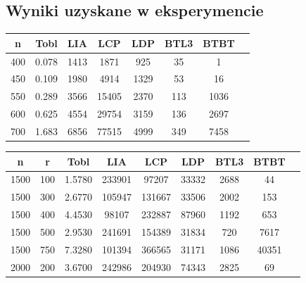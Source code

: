 \documentclass[10pt,a4paper]{article}
\begin{document}
\subsection{Wyniki uzyskane w eksperymencie}
\begin{center}
	\begin{tabular}{ |c|c|c|c|c|c|c|c| }
		\hline
		n   & Tobl  & LIA  & LCP   & LDP  & BTL3 & BTBT \\
		\hline
		400 & 0.078 & 1413 & 1871  & 925  & 35   & 1    \\
		\hline
		450 & 0.109 & 1980 & 4914  & 1329 & 53   & 16   \\
		\hline
		550 & 0.289 & 3566 & 15405 & 2370 & 113  & 1036 \\
		\hline
		600 & 0.625 & 4554 & 29754 & 3159 & 136  & 2697 \\
		\hline
		700 & 1.683 & 6856 & 77515 & 4999 & 349  & 7458 \\
		\hline
	\end{tabular}
\end{center}

\begin{center}
	\begin{tabular}{ |c|c|c|c|c|c|c|c|c| }
		\hline
		n    & r   & Tobl   & LIA    & LCP    & LDP   & BTL3 & BTBT  \\
		\hline
		1500 & 100 & 1.5780 & 233901 & 97207  & 33332 & 2688 & 44    \\
		\hline
		1500 & 300 & 2.6770 & 105947 & 131667 & 33506 & 2002 & 153   \\
		\hline
		1500 & 400 & 4.4530 & 98107  & 232887 & 87960 & 1192 & 653   \\
		\hline
		1500 & 500 & 2.9530 & 241691 & 154389 & 31834 & 720  & 7617  \\
		\hline
		1500 & 750 & 7.3280 & 101394 & 366565 & 31171 & 1086 & 40351 \\
		\hline
		2000 & 200 & 3.6700 & 242986 & 204930 & 74343 & 2825 & 69    \\
		\hline
	\end{tabular}
\end{center}
\end{document}
